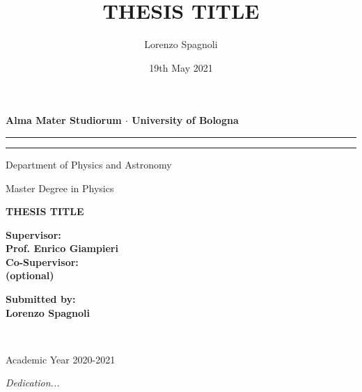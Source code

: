 \documentclass[12pt,a4paper]{report}
\theoremstyle{definition}
\theoremstyle{remark}
\begin{document}
\title{THESIS TITLE}
\author{Lorenzo Spagnoli}
\date{19th May 2021}

\begin{titlepage}
    \begin{center}
        \vspace*{0.2cm}
        {\fontsize{19pt}{20pt}\selectfont \textbf{Alma Mater Studiorum $\cdot$ University of Bologna}\par}
    
        \par\noindent\rule{\textwidth}{.5pt}
        \rule[.5\baselineskip]{\textwidth}{1.5pt}
        \vspace{0.8cm}
        
        \normalfont
        
        Department of Physics and Astronomy
        
        Master Degree in Physics
        
        \Large
        \vspace{5cm}
        {\fontsize{22.5pt}{22.5}\textcolor{MyDarkRed}{\textbf{THESIS TITLE}}}

        
        \vspace{4.5cm}
        \begin{minipage}[t]{0.64\textwidth}
        \begin{flushleft}
        {\fontsize{16pt}{16pt}\textbf{Supervisor:} \\ \textbf{\textcolor{MyDarkRed}{Prof. Enrico Giampieri}}} \\
        {\fontsize{16pt}{16pt}\textbf{Co-Supervisor:} \\ \textbf{\textcolor{MyDarkRed}{(optional)}}} 
        \end{flushleft}
        \end{minipage}
        \begin{minipage}[t]{0.34\textwidth}
        \begin{flushright} \Large
        \textbf{Submitted by:} \\
        \textbf{\textcolor{MyDarkRed}{Lorenzo Spagnoli}} \\
        \end{flushright}
        \end{minipage}\\
        
        \vfill
        \vspace{0.3cm}
        \small
        
        Academic Year {\textcolor{MyDarkRed} {2020-2021}}
    \end{center}
\end{titlepage}
\restoregeometry
\vspace*{5cm}
\begin{flushright}
  {\parbox{4.2cm}{\textit{Dedication...}}}
\end{flushright}
\end{document}

